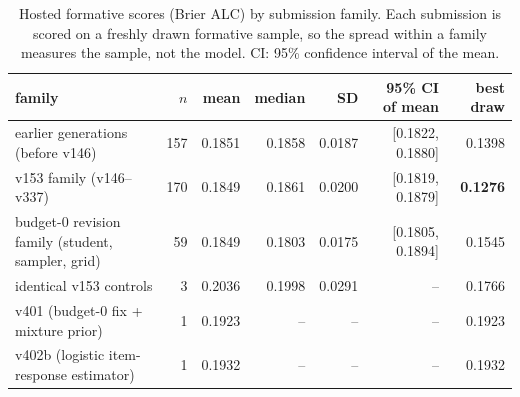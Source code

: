 \documentclass{article}
\begin{document}
\begin{table}[h]
\centering\small
\caption{Hosted formative scores (Brier ALC) by submission family. Each submission is scored on a freshly drawn formative sample, so the spread within a family measures the sample, not the model. CI: 95\% confidence interval of the mean.}
\label{tab:hosted}
\begin{tabular}{lrrrrrr}
\toprule
family & $n$ & mean & median & SD & 95\% CI of mean & best draw \\
\midrule
earlier generations (before v146) & 157 & 0.1851 & 0.1858 & 0.0187 & [0.1822, 0.1880] & 0.1398 \\
v153 family (v146--v337) & 170 & 0.1849 & 0.1861 & 0.0200 & [0.1819, 0.1879] & \textbf{0.1276} \\
budget-0 revision family (student, sampler, grid) & 59 & 0.1849 & 0.1803 & 0.0175 & [0.1805, 0.1894] & 0.1545 \\
identical v153 controls & 3 & 0.2036 & 0.1998 & 0.0291 & -- & 0.1766 \\
v401 (budget-0 fix + mixture prior) & 1 & 0.1923 & -- & -- & -- & 0.1923 \\
v402b (logistic item-response estimator) & 1 & 0.1932 & -- & -- & -- & 0.1932 \\
\bottomrule
\end{tabular}
\end{table}
\end{document}
